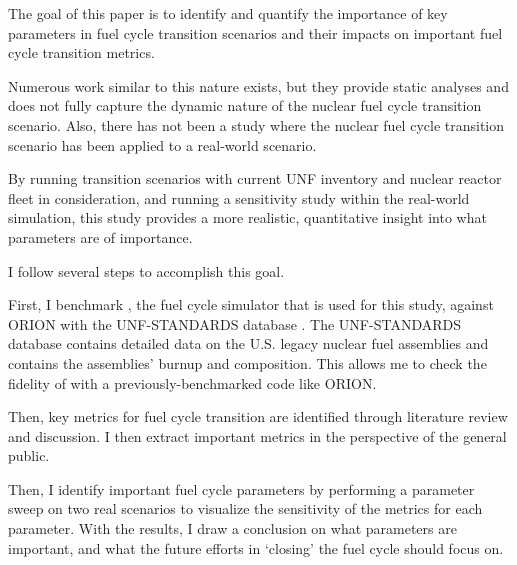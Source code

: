 The goal of this paper is to identify and quantify the
importance of key parameters in fuel cycle transition scenarios
and their impacts on important fuel cycle transition metrics.

Numerous work similar to this nature exists, but they provide
static analyses and does not fully capture the dynamic nature
of the nuclear fuel cycle transition scenario. Also, there
has not been a study where the nuclear fuel cycle transition
scenario has been applied to a real-world scenario.

By running transition scenarios with current \gls{UNF}
inventory and nuclear reactor fleet in consideration,
and running a sensitivity study within the real-world simulation,
this study provides a more realistic, quantitative insight
into what parameters are of importance.

I follow several steps to accomplish this goal.

First, I benchmark \Cyclus, the fuel cycle simulator that is used for this study,
against \gls{ORION} \cite{gregg_analysis_2012} with the \gls{UNF-STANDARDS} database
\cite{peterson_used_2013}. The \gls{UNF-STANDARDS} database contains detailed
data on the U.S. legacy nuclear fuel assemblies and contains the
assemblies' burnup and composition. This allows me to check the fidelity
of \Cyclus with a previously-benchmarked code like \gls{ORION}.

Then, key metrics for fuel cycle transition
are identified through literature review and discussion. I then
extract important metrics in the perspective of the general public.

Then, I identify important fuel cycle parameters by performing a parameter
sweep on two real scenarios to visualize the sensitivity of the metrics
for each parameter. With the results, I draw a conclusion on what parameters
are important, and what the future efforts in `closing' the fuel cycle
should focus on.